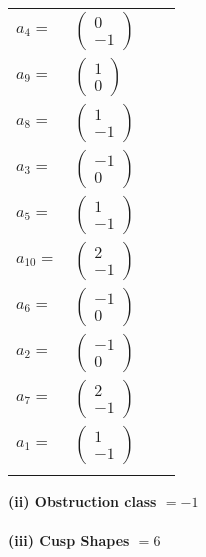 \documentclass[1p]{elsarticle_modified}
\theoremstyle{definition}
\begin{document}
\begin{tabular}{m{7pt} m{180pt} m{7pt} m{180pt} }
\flushright $a_{4}=$&$\begin{pmatrix}0\\-1\end{pmatrix}$ \\
\flushright $a_{9}=$&$\begin{pmatrix}1\\0\end{pmatrix}$ \\
\flushright $a_{8}=$&$\begin{pmatrix}1\\-1\end{pmatrix}$ \\
\flushright $a_{3}=$&$\begin{pmatrix}-1\\0\end{pmatrix}$ \\
\flushright $a_{5}=$&$\begin{pmatrix}1\\-1\end{pmatrix}$ \\
\flushright $a_{10}=$&$\begin{pmatrix}2\\-1\end{pmatrix}$ \\
\flushright $a_{6}=$&$\begin{pmatrix}-1\\0\end{pmatrix}$ \\
\flushright $a_{2}=$&$\begin{pmatrix}-1\\0\end{pmatrix}$ \\
\flushright $a_{7}=$&$\begin{pmatrix}2\\-1\end{pmatrix}$ \\
\flushright $a_{1}=$&$\begin{pmatrix}1\\-1\end{pmatrix}$\\&\end{tabular}
\flushleft \textbf{(ii) Obstruction class $= -1$}\\~\\
\flushleft \textbf{(iii) Cusp Shapes $= 6$}\\~\\
\end{document}
